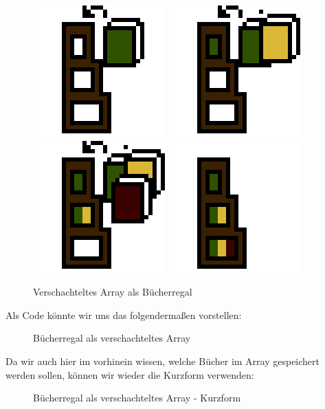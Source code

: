 \documentclass{tuda-pub}
\begin{document}
  \begin{figure}[h]
    \centering
    \includegraphics[width=.2\linewidth]{lib_2_1.png}
    \includegraphics[width=.2\linewidth]{lib_2_2.png}
    \includegraphics[width=.2\linewidth]{lib_2_3.png}
    \includegraphics[width=.2\linewidth]{lib_2_4.png}
    \caption{Verschachteltes Array als Bücherregal}
  \end{figure}

  Als Code könnte wir uns das folgendermaßen vorstellen:

  \begin{figure}[h]
    \centering
    
    \caption{Bücherregal als verschachteltes Array}
  \end{figure}

  Da wir auch hier im vorhinein wissen, welche Bücher im Array gespeichert werden sollen, können
  wir wieder die Kurzform verwenden:

  \begin{figure}[h]
    \centering
    
    \caption{Bücherregal als verschachteltes Array - Kurzform}
  \end{figure}
\end{document}
